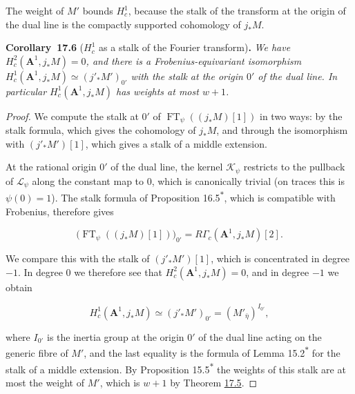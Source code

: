 \documentclass[11pt]{article}
\newenvironment{bpstatement}[2]{\par\addvspace{0.6\baselineskip}\noindent\textbf{#1}#2\textbf{.}\enspace\ignorespaces}
  {\par\addvspace{0.4\baselineskip}}
\newenvironment{bpstatementit}[2]{\begin{bpstatement}{#1}{#2}\itshape\ignorespaces}{\end{bpstatement}}
\newcommand{\bpout}[1]{#1\textsuperscript{\hyperlink{bp-outside}{\ensuremath{\ast}}}}
\begin{document}
The weight of \(M'\) bounds \(H^1_c\), because the stalk of the transform at the origin of the dual line is the compactly supported cohomology of \(j_*M\).

\label{bp19}%
\begin{bpstatementit}{Corollary~17.6}{ ($H^1_c$ as a stalk of the Fourier transform)}
We have \(H_c^2(\mathbf A^1,j_*M)=0\), and there is a Frobenius-equivariant isomorphism \(H_c^1(\mathbf A^1,j_*M)\simeq(j'_*M')_{0'}\) with the stalk at the origin \(0'\) of the dual line. In particular \(H_c^1(\mathbf A^1,j_*M)\) has weights at most \(w+1\).
\end{bpstatementit}

\begin{proof}[{Proof}]\label{bp20}%
We compute the stalk at \(0'\) of \(\operatorname{FT}_\psi((j_*M)[1])\) in two ways: by the stalk formula, which gives the cohomology of \(j_*M\), and through the isomorphism with \((j'_*M')[1]\), which gives a stalk of a middle extension.

At the rational origin \(0'\) of the dual line, the kernel \(\mathcal K_\psi\) restricts to the pullback of \(\mathcal L_\psi\) along the constant map to \(0\), which is canonically trivial (on traces this is \(\psi(0)=1\)). The stalk formula of Proposition \bpout{16.5}, which is compatible with Frobenius, therefore gives

\[
\bigl(\operatorname{FT}_\psi((j_*M)[1])\bigr)_{0'}
=R\Gamma_c(\mathbf A^1,j_*M)[2].
\]

We compare this with the stalk of \((j'_*M')[1]\), which is concentrated in degree \(-1\). In degree \(0\) we therefore see that \(H_c^2(\mathbf A^1,j_*M)=0\), and in degree \(-1\) we obtain

\[
H_c^1(\mathbf A^1,j_*M)
\simeq(j'_*M')_{0'}
=(M'_{\bar\eta})^{I_{0'}},
\]

where \(I_{0'}\) is the inertia group at the origin \(0'\) of the dual line acting on the generic fibre of \(M'\), and the last equality is the formula of Lemma \bpout{15.2} for the stalk of a middle extension. By Proposition \bpout{15.5} the weights of this stalk are at most the weight of \(M'\), which is \(w+1\) by Theorem \hyperref[bp16]{17.5}.
\end{proof}


\end{document}
